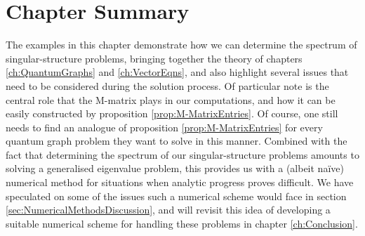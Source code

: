 \section{Chapter Summary} \label{sec:ExamplesSummary}
The examples in this chapter demonstrate how we can determine the spectrum of singular-structure problems, bringing together the theory of chapters \ref{ch:QuantumGraphs} and \ref{ch:VectorEqns}, and also highlight several issues that need to be considered during the solution process.
Of particular note is the central role that the M-matrix plays in our computations, and how it can be easily constructed by proposition \ref{prop:M-MatrixEntries}.
Of course, one still needs to find an analogue of proposition \ref{prop:M-MatrixEntries} for every quantum graph problem they want to solve in this manner.
Combined with the fact that determining the spectrum of our singular-structure problems amounts to solving a generalised eigenvalue problem, this provides us with a (albeit na\"ive) numerical method for situations when analytic progress proves difficult.
We have speculated on some of the issues such a numerical scheme would face in section \ref{sec:NumericalMethodsDiscussion}, and will revisit this idea of developing a suitable numerical scheme for handling these problems in chapter \ref{ch:Conclusion}. \newline

